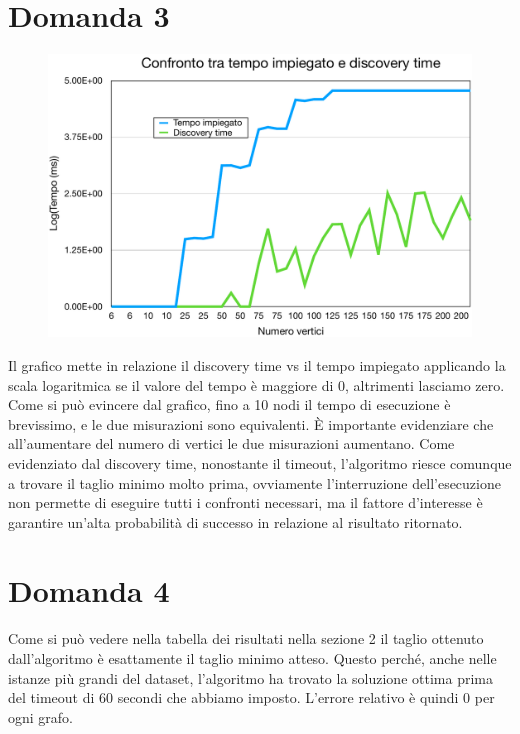 \documentclass[a4paper]{article}
\begin{document}
\section{Domanda 3}
\begin{figure}[H]
	\begin{center}
	\includegraphics[width=17cm]{discoveryvsfulltime}
	\label{fig:discoveryvsfulltime}
\end{center}
\end{figure}
Il grafico mette in relazione il discovery time vs il tempo impiegato applicando la scala logaritmica se il valore del tempo è maggiore di 0, altrimenti lasciamo zero. Come si può evincere dal grafico, fino a 10 nodi il tempo di esecuzione è brevissimo, e le due misurazioni sono equivalenti. È importante evidenziare che all'aumentare del numero di vertici le due misurazioni aumentano. Come evidenziato dal discovery time, nonostante il timeout, l'algoritmo riesce comunque a trovare il taglio minimo molto prima, ovviamente l'interruzione dell'esecuzione non permette di eseguire tutti i confronti necessari, ma il fattore d'interesse è garantire un'alta probabilità di successo in relazione al risultato ritornato.


\section{Domanda 4}
Come si può vedere nella tabella dei risultati nella sezione 2 il taglio ottenuto dall'algoritmo è esattamente il taglio minimo atteso. Questo perché, anche nelle istanze più grandi del dataset, l'algoritmo ha trovato la soluzione ottima prima del timeout di 60 secondi che abbiamo imposto. L'errore relativo è quindi 0 per ogni grafo.
\end{document}
